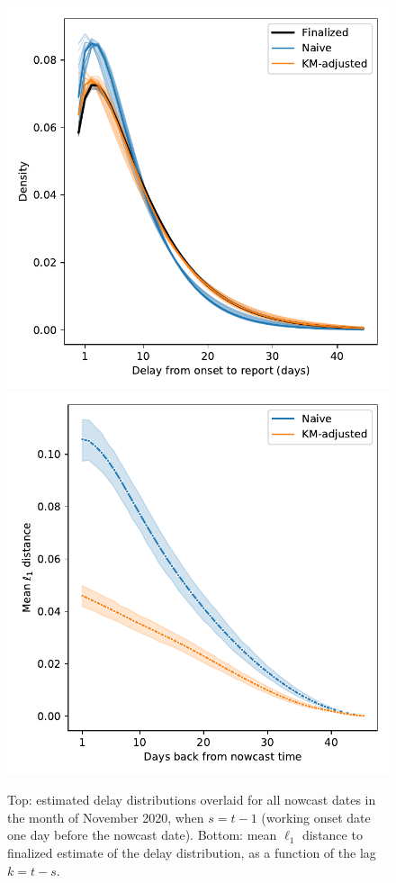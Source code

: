 \documentclass[sts]{imsart}
\theoremstyle{plain}
\theoremstyle{definition}
\theoremstyle{remark}
\begin{document}
\begin{figure}[tb]
\centering
\includegraphics[width=0.825\linewidth]{./figures/range_overlay.pdf}
\includegraphics[width=0.825\linewidth]{./figures/l1_summary.pdf}
\caption{Top: estimated delay distributions overlaid for all nowcast dates in
  the month of November 2020, when $s=t-1$ (working onset date one day 
  before the nowcast date). Bottom: mean $\ell_1$ distance to finalized
  estimate of the delay distribution, as a function of the lag $k=t-s$.}     
\label{fig:delay_dist_realtime}
\end{figure}
\end{document}
